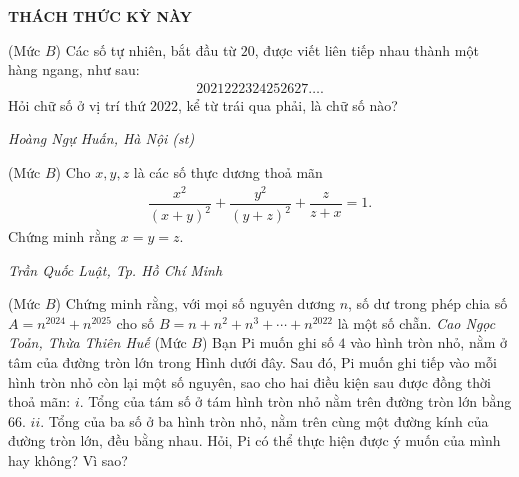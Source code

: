 \begin{center}
	\vspace*{-5pt}
	\textbf{\color{thachthuctoanhoc}\color{thachthuctoanhoc}THÁCH THỨC KỲ NÀY}
	\vspace*{-5pt}
\end{center}
\begin{multicols}{2}
	\setlength{\abovedisplayskip}{4pt}
	\setlength{\belowdisplayskip}{4pt}
	{}
	(Mức $B$) Các số tự nhiên, bắt đầu từ $20$, được viết liên tiếp nhau thành một hàng ngang, như sau:
	\begin{align*}
		2021222324252627\ldots.
	\end{align*}
	Hỏi chữ số ở vị trí thứ $2022$, kể từ trái qua phải, là chữ số nào?
	\begin{flushright}
		\textit{Hoàng Ngự Huấn, Hà Nội (st)}
	\end{flushright}
	{}
	(Mức $B$) Cho $x,y,z$ là các số thực dương thoả mãn 
	\begin{align*}
		\dfrac{x^2}{(x+y)^2}+\dfrac{y^2}{(y+z)^2}+\dfrac z{z+x}=1.
	\end{align*}
	Chứng minh rằng $x=y=z$. 
	\begin{flushright}
		\textit{Trần Quốc Luật, Tp. Hồ Chí Minh}
	\end{flushright}
	{}
	(Mức $B$) Chứng minh rằng, với mọi số nguyên dương $n$, số dư trong phép chia số $A=n^{2024}+n^{2025}$  cho số $B=n+n^2+n^3+\cdots+n^{2022}$ là một số chẵn. 
	\vskip 0.05cm
	\hfill	\textit{Cao Ngọc Toản, Thừa Thiên Huế}
	\vskip 0.05cm
	{}
	(Mức $B$) Bạn Pi muốn ghi số $4$ vào hình tròn nhỏ, nằm ở tâm của đường tròn lớn trong Hình dưới đây. Sau đó, Pi muốn ghi tiếp vào mỗi hình tròn nhỏ còn lại một số nguyên, sao cho hai điều kiện sau được đồng thời thoả mãn: 
	\vskip 0.05cm
	$i.$ Tổng của tám số ở tám hình tròn nhỏ nằm trên đường tròn lớn bằng $66$. 
	\vskip 0.05cm
	$ii.$ Tổng của ba số ở ba hình tròn nhỏ, nằm trên cùng một đường kính của đường tròn lớn, đều bằng nhau. 
	\vskip 0.05cm
	Hỏi, Pi có thể thực hiện được ý muốn của mình hay không? Vì sao?
	\begin{figure}[H]
		\centering
		\vspace*{-5pt}
		\captionsetup{labelformat= empty, justification=centering}

\end{figure}
\end{multicols}
